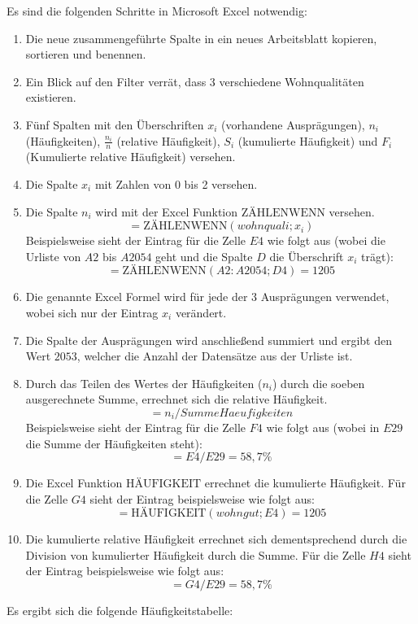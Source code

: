 Es sind die folgenden Schritte in Microsoft Excel notwendig:

\begin{enumerate}
  \item Die neue zusammengeführte Spalte  in ein neues Arbeitsblatt kopieren,
  sortieren und benennen.
  \item Ein Blick auf den Filter verrät, dass 3 verschiedene Wohnqualitäten existieren.
  \item Fünf Spalten mit den Überschriften $x_i$ (vorhandene Ausprägungen), $n_i$
  (Häufigkeiten), $\frac{n_i}{n}$ (relative Häufigkeit), $S_i$ (kumulierte Häufigkeit) und $F_i$
  (Kumulierte relative Häufigkeit) versehen.
  \item Die Spalte $x_i$ mit Zahlen von 0 bis 2 versehen.
  \item Die Spalte $n_i$ wird mit der Excel Funktion $\text{ZÄHLENWENN}$ versehen.
  \[=\text{ZÄHLENWENN}(wohnquali;x_i)\] Beispielsweise sieht der
  Eintrag für die Zelle $E4$ wie folgt aus (wobei die Urliste von $A2$ bis $A2054$ geht und
  die Spalte $D$ die Überschrift $x_i$ trägt): \[=\text{ZÄHLENWENN}(A2:A2054;D4)=1205\]
  \item Die genannte Excel Formel wird für jede der 3 Ausprägungen verwendet, wobei sich nur der Eintrag $x_i$ verändert.
  \item Die Spalte der Ausprägungen wird anschließend summiert und ergibt den Wert $2053$, welcher
  die Anzahl der Datensätze aus der Urliste ist.
  \item Durch das Teilen des Wertes der Häufigkeiten ($n_i$) durch die soeben
  ausgerechnete Summe, errechnet sich die relative Häufigkeit. \[=n_i/SummeHaeufigkeiten\]
  Beispielsweise sieht der Eintrag für die Zelle $F4$ wie folgt aus (wobei in $E29$ die Summe der
  Häufigkeiten steht): \[=E4/E29=58,7\%\]
  \item Die Excel Funktion $\text{HÄUFIGKEIT}$ errechnet die kumulierte Häufigkeit. 
  Für die Zelle $G4$ sieht der Eintrag beispielsweise wie folgt aus: \[=\text{HÄUFIGKEIT}(wohngut;E4)=1205\] 
  \item Die kumulierte relative Häufigkeit errechnet sich dementsprechend durch die Division von kumulierter Häufigkeit durch die Summe. 
  Für die Zelle $H4$ sieht der Eintrag beispielsweise wie folgt aus: \[=G4/E29=58,7\%\]
\end{enumerate} 
 
Es ergibt sich die folgende Häufigkeitstabelle:

